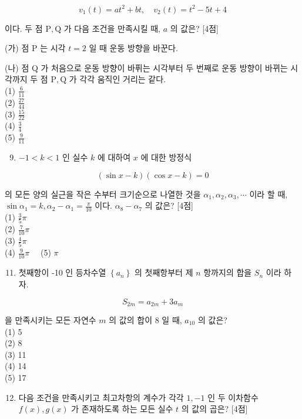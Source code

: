 \documentclass[10pt]{article}
\begin{document}
\[
v_{1}(t)=a t^{2}+b t, \quad v_{2}(t)=t^{2}-5 t+4
\]

이다. 두 점 $\mathrm{P}, \mathrm{Q}$ 가 다음 조건을 만족시킬 때, $a$ 의 값은? [4점]

(가) 점 P 는 시각 $t=2$ 일 때 운동 방향을 바꾼다.

(나) 점 Q 가 처음으로 운동 방향이 바퓌는 시각부터 두 번째로 운동 방향이 바뀌는 시각까지 두 점 $\mathrm{P}, \mathrm{Q}$ 가 각각 움직인 거리는 같다.\\
(1) $\frac{6}{11}$\\
(2) $\frac{27}{44}$\\
(3) $\frac{15}{22}$\\
(4) $\frac{3}{4}$\\
(5) $\frac{9}{11}$

\begin{enumerate}
  \setcounter{enumi}{8}
  \item $-1<k<1$ 인 실수 $k$ 에 대하여 $x$ 에 대한 방정식
\end{enumerate}

\[
(\sin x-k)(\cos x-k)=0
\]

의 모든 양의 실근을 작은 수부터 크기순으로 나열한 것을 $\alpha_{1}, \alpha_{2}, \alpha_{3}, \cdots$ 이라 할 때, $\sin \alpha_{1}=k, \alpha_{2}-\alpha_{1}=\frac{\pi}{10}$ 이다. $\alpha_{8}-\alpha_{7}$ 의 값은? [4점]\\
(1) $\frac{3}{5} \pi$\\
(2) $\frac{7}{10} \pi$\\
(3) $\frac{4}{5} \pi$\\
(4) $\frac{9}{10} \pi \quad$ (5) $\pi$

\begin{enumerate}
  \setcounter{enumi}{10}
  \item 첫째항이 -10 인 등차수열 $\left\{a_{n}\right\}$ 의 첫째항부터 제 $n$ 항까지의 합을 $S_{n}$ 이라 하자.
\end{enumerate}

\[
S_{2 m}=a_{2 m}+3 a_{m}
\]

을 만족시키는 모든 자연수 $m$ 의 값의 합이 8 일 때, $a_{10}$ 의 값은?\\
(1) 5\\
(2) 8\\
(3) 11\\
(4) 14\\
(5) 17

\begin{enumerate}
  \setcounter{enumi}{11}
  \item 다음 조건을 만족시키고 최고차항의 계수가 각각 $1,-1$ 인 두 이차함수 $f(x), g(x)$ 가 존재하도록 하는 모든 실수 $t$ 의 값의 곱은? [4점]
\end{enumerate}
\end{document}
